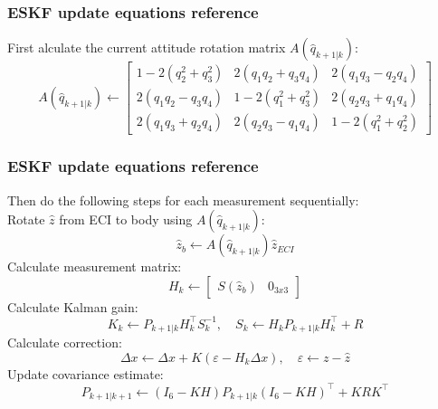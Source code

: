 \documentclass{beamer}
\begin{document}

\begin{frame}
    \frametitle{ESKF update equations reference}
    First alculate the current attitude rotation matrix $A(\hat{q}_{k+1|k})$:
    \begin{equation}
        A(\hat{q}_{k+1|k}) \leftarrow \begin{bmatrix}
            1 - 2(q_2^2 + q_3^2) & 2(q_1 q_2 + q_3 q_4) & 2(q_1 q_3 - q_2 q_4) \\
            2(q_1 q_2 - q_3 q_4) & 1 - 2(q_1^2 + q_3^2) & 2(q_2 q_3 + q_1 q_4) \\
            2(q_1 q_3 + q_2 q_4) & 2(q_2 q_3 - q_1 q_4) & 1 - 2(q_1^2 + q_2^2)
        \end{bmatrix}
    \end{equation}
\end{frame}


\begin{frame}
    \frametitle{ESKF update equations reference}
    Then do the following steps for each measurement sequentially: \\
    Rotate $\hat{z}$ from ECI to body using $A(\hat{q}_{k+1|k})$:
    \begin{equation}
        \hat{z}_b \leftarrow A(\hat{q}_{k+1|k}) \hat{z}_{ECI}
    \end{equation}
    Calculate measurement matrix:
    \begin{equation}
        H_k \leftarrow \begin{bmatrix}
            S(\hat{z}_b) & 0_{3x3}
        \end{bmatrix}
    \end{equation}
    Calculate Kalman gain:
    \begin{equation}
        K_k \leftarrow P_{k+1|k} H_k^{\top} S_k^{-1}, \quad S_k \leftarrow H_k P_{k+1|k} H_k^{\top} + R
    \end{equation}
    Calculate correction:
    \begin{equation}
        \Delta x \leftarrow \Delta x + K (\varepsilon - H_k \Delta x), \quad \varepsilon \leftarrow z - \hat{z}
    \end{equation}
    Update covariance estimate:
    \begin{equation}
        {P}_{k+1 | k+1} \leftarrow \left({I}_{6}-{K} {H}\right) {P}_{k+1 | k}\left({I}_{6}-{K} {H}\right)^{\top}+{K} {R} {K}^{\top}
    \end{equation}
\end{frame}
\end{document}
